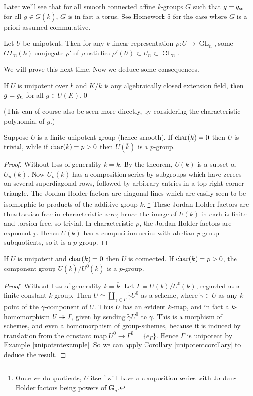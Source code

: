 \documentclass[10pt]{article}
\newcommand{\GL}{\operatorname{GL}}
\renewcommand{\(}{\left(}
\renewcommand{\)}{\right)}
\renewcommand{\bar}{\overline}
\renewcommand{\tilde}{\widetilde}
\newcommand{\onto}{\twoheadrightarrow }
\numberwithin{thm}{subsection}
\begin{document}
\begin{rem}
Later we'll see that for all smooth connected affine $k$-groups $G$
such that $g=g_{\rm{ss}}$ for all $g\in G(\bar k)$,
$G$ is in fact a torus. 
See Homework 5 for the case where $G$ is a priori assumed commutative.
\end{rem}
\begin{thm}\label{unipotenttheorem}Let $U$ be unipotent.
Then for any $k$-linear representation
$\rho:U\to \GL_n$,
some $GL_n(k)$-conjugate $\rho'$ of $\rho$
satisfies $\rho'(U)\subset U_n\subset \GL_n$.
\end{thm}

We will prove this next time.  Now we deduce some consequences. 

\begin{cor}If $U$ is unipotent over $k$
and $K/k$ is any algebraically closed extension field,
then $g=g_{\rm{u}}$ for all $g\in U(K)$.\qed
\end{cor}
(This can of course also be seen more directly, by considering the characteristic polynomial of $g$.)
\begin{cor}\label{unipotentcorollary}Suppose $U$ is a finite unipotent group (hence smooth).
If ${\rm{char}}(k)=0$ then $U$ is trivial,
while if ${\rm{char}}(k)=p > 0$ then $U(\bar k)$ is a $p$-group. 
\end{cor}
\begin{proof}
Without loss of generality $k=\bar k$.
By the theorem, $U(k)$ is a subset of $U_n(k)$.
Now $U_n(k)$ has a composition series by
subgroups which have zeroes on several superdiagonal rows, followed
by arbitrary entries in a top-right corner triangle.
The Jordan-Holder factors are diagonal lines which are easily seen to be isomorphic to products of the additive group $k$.
\footnote{Once we do quotients, $U$ itself will have a composition
series with Jordan-Holder factors being powers of $\mathbf{G}_a$.}
These Jordan-Holder factors are thus torsion-free in characteristic zero;
hence the image of $U(k)$ in each is finite and torsion-free, so trivial.
In characteristic $p$, the Jordan-Holder factors are exponent $p$.
Hence $U(k)$ has a composition series
with abelian $p$-group subquotients, so it is a $p$-group.
\end{proof}
\begin{cor}
If $U$ is unipotent and ${\rm{char}}(k)=0$ then $U$ is connected.
If ${\rm{char}}(k)=p>0$, the component group $U(\bar k)/U^0(\bar k)$ is a $p$-group.
\end{cor}
\begin{proof}
Without loss of generality $k=\bar k$. 
Let $\Gamma=U(k)/U^0(k)$, regarded as a finite constant $k$-group.
Then $U\simeq\coprod_{\gamma\in \Gamma}\tilde \gamma U^0$
as a scheme, where $\tilde \gamma\in U$ as any $k$-point
of the $\gamma$-component of $U$.
Thus $U$ has an evident $k$-map, and in fact
a $k$-homomorphism
$U\onto \Gamma$, given by sending $\tilde \gamma U^0$ to $\gamma$.
This is a morphism of schemes, and even a homomorphism of group-schemes,
because it is induced by translation
from the constant map $U^0\to \Gamma^0=\{e_\Gamma\}$.
Hence $\Gamma$ is unipotent by Example \ref{unipotentexample}.
So we can apply Corollary \ref{unipotentcorollary}
to deduce the result.
\end{proof}
\end{document}
